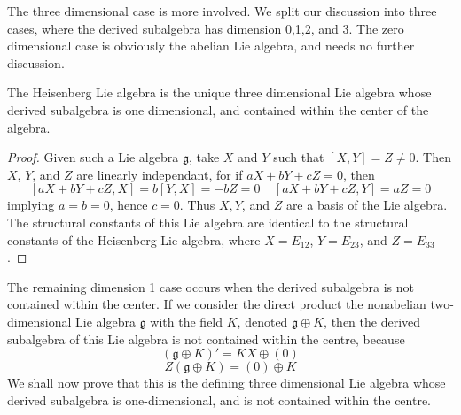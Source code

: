 The three dimensional case is more involved. We split our discussion into three cases, where the derived subalgebra has dimension 0,1,2, and 3. The zero dimensional case is obviously the abelian Lie algebra, and needs no further discussion.

\begin{theorem}
    The Heisenberg Lie algebra is the unique three dimensional Lie algebra whose derived subalgebra is one dimensional, and contained within the center of the algebra.
\end{theorem}
\begin{proof}
    Given such a Lie algebra $\mathfrak{g}$, take $X$ and $Y$ such that $[X,Y] = Z \neq 0$. Then $X$, $Y$, and $Z$ are linearly independant, for if $aX + bY + cZ = 0$, then
    \[ [aX + bY + cZ, X] = b[Y,X] = -bZ = 0\ \ \ \ \ [aX + bY + cZ, Y] = aZ = 0 \]
    implying $a = b = 0$, hence $c = 0$. Thus $X,Y$, and $Z$ are a basis of the Lie algebra. The structural constants of this Lie algebra are identical to the structural constants of the Heisenberg Lie algebra, where $X = E_{12}$, $Y = E_{23}$, and $Z = E_{33}$.
\end{proof}

The remaining dimension 1 case occurs when the derived subalgebra is not contained within the center. If we consider the direct product the nonabelian two-dimensional Lie algebra $\mathfrak{g}$ with the field $K$, denoted $\mathfrak{g} \oplus K$, then the derived subalgebra of this Lie algebra is not contained within the centre, because
%
\[ (\mathfrak{g} \oplus K)' = KX \oplus (0) \]
\[ Z(\mathfrak{g} \oplus K) = (0) \oplus K \]
%
We shall now prove that this is the defining three dimensional Lie algebra whose derived subalgebra is one-dimensional, and is not contained within the centre.


